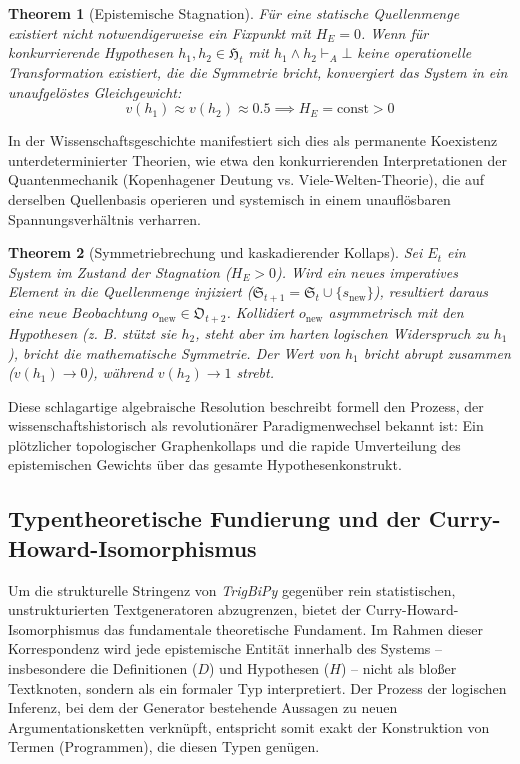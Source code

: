 \documentclass[11pt, a4paper]{article}
\newtheorem{theorem}{Theorem}
\begin{document}
	\begin{theorem}[Epistemische Stagnation]
		Für eine statische Quellenmenge existiert nicht notwendigerweise ein Fixpunkt mit $H_E = 0$. Wenn für konkurrierende Hypothesen $h_1, h_2 \in \mathfrak{H}_t$ mit $h_1 \land h_2 \vdash_A \bot$ keine operationelle Transformation existiert, die die Symmetrie bricht, konvergiert das System in ein unaufgelöstes Gleichgewicht:
		\[
		v(h_1) \approx v(h_2) \approx 0.5 \implies H_E = \text{const} > 0
		\]
	\end{theorem}
	
	In der Wissenschaftsgeschichte manifestiert sich dies als permanente Koexistenz unterdeterminierter Theorien, wie etwa den konkurrierenden Interpretationen der Quantenmechanik (Kopenhagener Deutung vs. Viele-Welten-Theorie), die auf derselben Quellenbasis operieren und systemisch in einem unauflösbaren Spannungsverhältnis verharren.
	
	\begin{theorem}[Symmetriebrechung und kaskadierender Kollaps]
		Sei $E_t$ ein System im Zustand der Stagnation ($H_E > 0$). Wird ein neues imperatives Element in die Quellenmenge injiziert ($\mathfrak{S}_{t+1} = \mathfrak{S}_t \cup \{s_{\text{new}}\}$), resultiert daraus eine neue Beobachtung $o_{\text{new}} \in \mathfrak{O}_{t+2}$. Kollidiert $o_{\text{new}}$ asymmetrisch mit den Hypothesen (z. B. stützt sie $h_2$, steht aber im harten logischen Widerspruch zu $h_1$), bricht die mathematische Symmetrie. Der Wert von $h_1$ bricht abrupt zusammen ($v(h_1) \to 0$), während $v(h_2) \to 1$ strebt.
	\end{theorem}
	
	Diese schlagartige algebraische Resolution beschreibt formell den Prozess, der wissenschaftshistorisch als revolutionärer Paradigmenwechsel bekannt ist: Ein plötzlicher topologischer Graphenkollaps und die rapide Umverteilung des epistemischen Gewichts über das gesamte Hypothesenkonstrukt.
	
	\subsection{Typentheoretische Fundierung und der Curry-Howard-Isomorphismus}
	
	Um die strukturelle Stringenz von \emph{TrigBiPy} gegenüber rein statistischen, unstrukturierten Textgeneratoren abzugrenzen, bietet der Curry-Howard-Isomorphismus das fundamentale theoretische Fundament. Im Rahmen dieser Korrespondenz wird jede epistemische Entität innerhalb des Systems – insbesondere die Definitionen ($D$) und Hypothesen ($H$) – nicht als bloßer Textknoten, sondern als ein formaler Typ interpretiert. Der Prozess der logischen Inferenz, bei dem der Generator bestehende Aussagen zu neuen Argumentationsketten verknüpft, entspricht somit exakt der Konstruktion von Termen (Programmen), die diesen Typen genügen.
	
\end{document}
